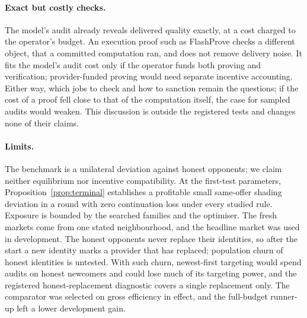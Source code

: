 \documentclass[11pt]{article}
\begin{document}
\paragraph{Exact but costly checks.} The model's audit already reveals delivered quality exactly, at a cost charged to the operator's budget. An execution proof such as FlashProve checks a different object, that a committed computation ran, and does not remove delivery noise. It fits the model's audit cost only if the operator funds both proving and verification; provider-funded proving would need separate incentive accounting. Either way, which jobs to check and how to sanction remain the questions; if the cost of a proof fell close to that of the computation itself, the case for sampled audits would weaken. This discussion is outside the registered tests and changes none of their claims.

\paragraph{Limits.} The benchmark is a unilateral deviation against honest opponents; we claim neither equilibrium nor incentive compatibility. At the first-test parameters, Proposition~\ref{prop:terminal} establishes a profitable small same-offer shading deviation in a round with zero continuation loss under every studied rule. Exposure is bounded by the searched families and the optimiser. The fresh markets come from one stated neighbourhood, and the headline market was used in development. The honest opponents never replace their identities, so after the start a new identity marks a provider that has replaced; population churn of honest identities is untested. With such churn, newest-first targeting would spend audits on honest newcomers and could lose much of its targeting power, and the registered honest-replacement diagnostic covers a single replacement only. The comparator was selected on gross efficiency in effect, and the full-budget runner-up left a lower development gain.
\end{document}
